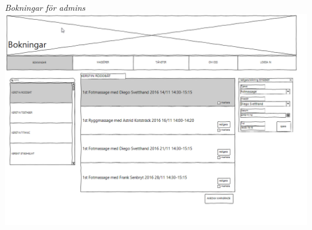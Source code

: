 \documentclass[11pt, titlepage, oneside, a4paper]{article}	%
\begin{document}
\begin{center}
    \textit{Bokningar för admins}
    \includegraphics[width=1\textwidth]{../Bilder/Wireframe/a_bokningar}
    
    
\end{center}


\newpage

 


\newpage
\appendix
\end{document}
